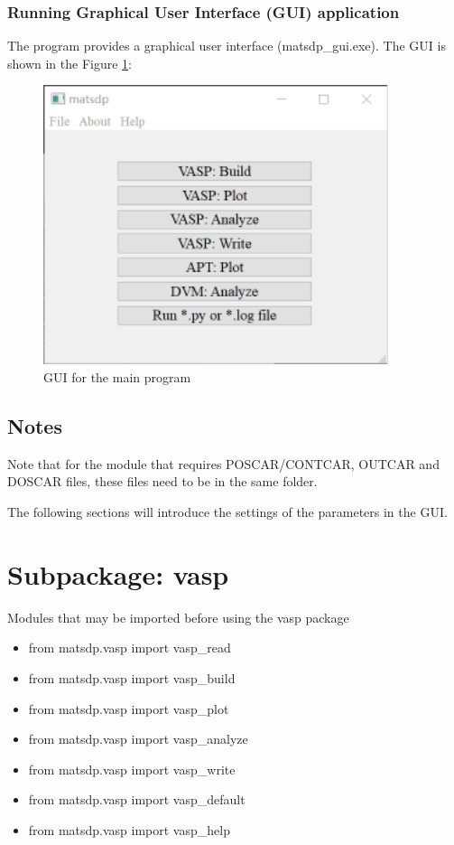 \documentclass[12pt]{book}
\begin{document}
\subsection{Running Graphical User Interface (GUI) application}
The program provides a graphical user interface (matsdp\_gui.exe). The GUI is shown in the Figure \ref{fig:GUI_Main}:

\begin{figure}[htbp]
\centering
\includegraphics[width=0.9\textwidth]{gui_matsdp.pdf}
\caption{GUI for the main program}
\label{fig:GUI_Main}
\end{figure}

\section{Notes}

Note that for the module that requires POSCAR/CONTCAR, OUTCAR and DOSCAR files, these files need to be in the same folder.

The following sections will introduce the settings of the parameters in the GUI. 

\chapter{Subpackage: vasp}

Modules that may be imported before using the vasp package
\begin{itemize}
\item from matsdp.vasp import vasp\_read
\item from matsdp.vasp import vasp\_build
\item from matsdp.vasp import vasp\_plot
\item from matsdp.vasp import vasp\_analyze
\item from matsdp.vasp import vasp\_write
\item from matsdp.vasp import vasp\_default
\item from matsdp.vasp import vasp\_help
\end{itemize}
\end{document}

